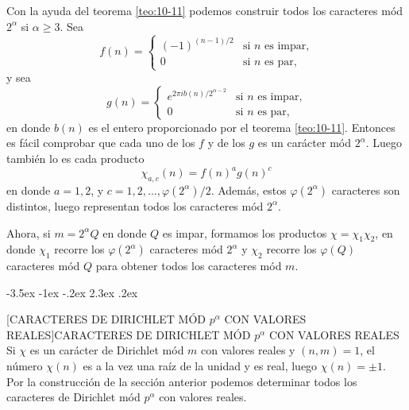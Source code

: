 \documentclass[12pt,a4paper]{book}
\makeatletter
\renewcommand\section{\@startsection{section}{1}{\z@}%
  {-3.5ex \@plus -1ex \@minus -.2ex}%
  {2.3ex \@plus .2ex}%
  {\normalfont\Large\bfseries\raggedright}}
\makeatother
\begin{document}
    Con la ayuda del teorema \ref{teo:10-11} podemos construir todos los caracteres mód
    $2^{\alpha}$ si $\alpha\geq3$. Sea
    \begin{equation}\label{eq:10-24}
        f(n)=
        \begin{cases}
            (-1)^{(n-1)/2}&\text{si }n\text{ es impar,}\\
            0&\text{si }n\text{ es par,}
        \end{cases}
    \end{equation}
    y sea
    \begin{equation*}
        g(n)=
        \begin{cases}
            e^{2\pi ib(n)/2^{\alpha-2}}&\text{si }n\text{ es impar,}\\
            0&\text{si }n\text{ es par,}
        \end{cases}
    \end{equation*}
    en donde $b(n)$ es el entero proporcionado por el teorema \ref{teo:10-11}. Entonces es
    fácil comprobar que cada uno de los $f$ y de los $g$ es un carácter mód $2^{\alpha}$.
    Luego también lo es cada producto
    \begin{equation}\label{eq:10-25}
        \chi_{a,c}(n)=f(n)^{a}g(n)^{c}
    \end{equation}
    en donde $a=1,2$, y $c=1,2,\dots,\varphi(2^{\alpha})/2$. Además, estos $\varphi(2^{\alpha})$
    caracteres son distintos, luego representan todos los caracteres mód $2^{\alpha}$.

    Ahora, si $m=2^{\alpha}Q$ en donde $Q$ es impar, formamos los productos
    $\chi=\chi_{1}\chi_{2}$, en donde $\chi_{1}$ recorre los $\varphi(2^{\alpha})$ caracteres mód
    $2^{\alpha}$ y $\chi_{2}$ recorre los $\varphi(Q)$ caracteres mód $Q$ para obtener todos
    los caracteres mód $m$.

    \section[CARACTERES DE DIRICHLET MÓD \texorpdfstring{$p^{\alpha}$}{p\textasciicircum{}α} CON VALORES REALES]{CARACTERES DE DIRICHLET MÓD \texorpdfstring{$p^{\alpha}$}{p\textasciicircum{}α} CON VALORES REALES}
    Si $\chi$ es un carácter de Dirichlet mód $m$ con valores reales y $(n,m)=1$, el número
    $\chi(n)$ es a la vez una raíz de la unidad y es real, luego $\chi(n)=\pm1$. Por la
    construcción de la sección anterior podemos determinar todos los caracteres de
    Dirichlet mód $p^{\alpha}$ con valores reales.
\end{document}
